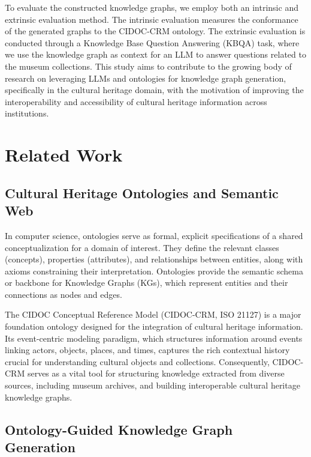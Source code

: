 \documentclass[a4, conference]{IEEEtran}
\begin{document}
To evaluate the constructed knowledge graphs, we employ both an intrinsic and extrinsic evaluation method. The intrinsic evaluation measures the conformance of the generated graphs to the CIDOC-CRM ontology. The extrinsic evaluation is conducted through a Knowledge Base Question Answering (KBQA) task, where we use the knowledge graph as context for an LLM to answer questions related to the museum collections. This study aims to contribute to the growing body of research on leveraging LLMs and ontologies for knowledge graph generation, specifically in the cultural heritage domain, with the motivation of improving the interoperability and accessibility of cultural heritage information across institutions.

\section{Related Work}

\subsection{Cultural Heritage Ontologies and Semantic Web}

In computer science, ontologies serve as formal, explicit specifications of a shared conceptualization for a domain of interest. They define the relevant classes (concepts), properties (attributes), and relationships between entities, along with axioms constraining their interpretation. Ontologies provide the semantic schema or backbone for Knowledge Graphs (KGs), which represent entities and their connections as nodes and edges.

The CIDOC Conceptual Reference Model \cite{doerr2005thecidoc} (CIDOC-CRM, ISO 21127) is a major foundation ontology designed for the integration of cultural heritage information. Its event-centric modeling paradigm, which structures information around events linking actors, objects, places, and times, captures the rich contextual history crucial for understanding cultural objects and collections. Consequently, CIDOC-CRM serves as a vital tool for structuring knowledge extracted from diverse sources, including museum archives, and building interoperable cultural heritage knowledge graphs.

\subsection{Ontology-Guided Knowledge Graph Generation}
\end{document}
